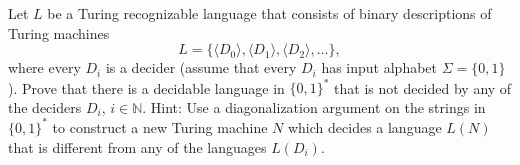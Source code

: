 \documentclass[12pt]{exam}
\newcommand{\N}{\mathbb{N}}
\begin{document}
\begin{questions}
\question Let $L$ be a Turing recognizable language that consists of binary descriptions of Turing machines 
$$L = \{\langle D_0 \rangle, \langle D_1 \rangle, \langle D_2 \rangle, \ldots \},$$ 
where every $D_i$ is a decider (assume that every $D_i$ has input alphabet $\Sigma = \{0,1\}$).
Prove that there is a decidable language in $\{0,1\}^*$ that is not decided by any of the deciders $D_i$, $i \in \N$.  Hint: Use a diagonalization argument on the strings in $\{0,1\}^*$ to construct a new Turing machine $N$ which decides a language $L(N)$ that is different from any of the languages $L(D_i)$.  
\begin{solution}

\end{solution}
\vfill

\end{questions}
\end{document}
